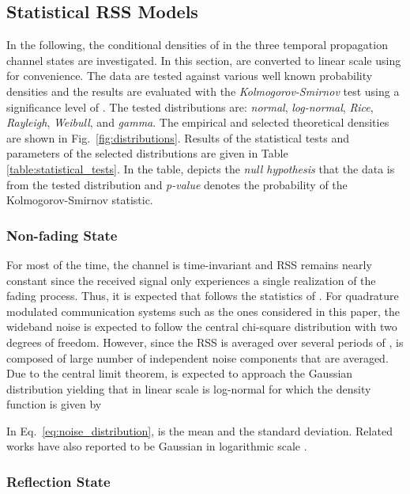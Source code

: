 \documentclass[journal, 10pt, twocolumn, balance]{IEEEtran}
\begin{document}
\subsection{Statistical RSS Models}\label{S:statistical_models}


In the following, the conditional densities of  in the three temporal propagation channel states are investigated. In this section,  are converted to linear scale using  for convenience. The data are tested against various well known probability densities and the results are evaluated with the \emph{Kolmogorov-Smirnov} test \cite{massey1969} using a significance level of . The tested distributions are: \emph{normal}, \emph{log-normal}, \emph{Rice}, \emph{Rayleigh}, \emph{Weibull}, and \emph{gamma}. The empirical and selected theoretical densities are shown in Fig.~\ref{fig:distributions}. Results of the statistical tests and parameters of the selected distributions are given in Table \ref{table:statistical_tests}. In the table,  depicts the \emph{null hypothesis} that the data is from the tested distribution and \emph{p-value} denotes the probability of the Kolmogorov-Smirnov statistic.




\subsubsection{Non-fading State}
For most of the time, the channel is time-invariant and RSS remains nearly constant \cite{bultitude1987} since the received signal only experiences a single realization of the fading process. Thus, it is expected that  follows the statistics of . For quadrature modulated communication systems such as the ones considered in this paper, the wideband noise is expected to follow the central chi-square distribution with two degrees of freedom. However, since the RSS is averaged over several periods of ,  is composed of large number of independent noise components that are averaged. Due to the central limit theorem,  is expected to approach the Gaussian distribution yielding that  in linear scale is log-normal for which the density function is given by

In Eq.~\eqref{eq:noise_distribution},  is the mean and  the standard deviation. Related works have also reported  to be Gaussian in logarithmic scale \cite{Zheng2012,Wilson2010,kaltiokallio2014}.


\subsubsection{Reflection State}
\end{document}
